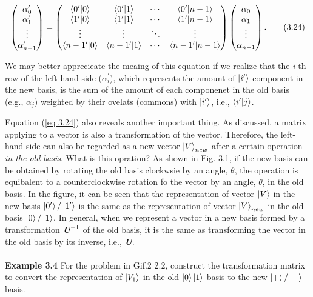 \documentclass{article}
\begin{document}
\begin{equation} \label{eq 3.24}
    \begin{pmatrix}
        \alpha^\prime_0\\
        \alpha^\prime_1\\
        \vdots\\
        \alpha^\prime_{n-1}\\
    \end{pmatrix}=
    \begin{pmatrix}
        \braket{0^\prime|0}&\braket{0^\prime|1}&\cdots&\braket{0^\prime|n-1}\\
        \braket{1^\prime|0}&\braket{1^\prime|1}&\cdots&\braket{1^\prime|n-1}\\
        \vdots&\vdots&\ddots&\vdots\\
        \braket{n-1^\prime|0}&\braket{n-1^\prime|1}&\cdots&\braket{n-1^\prime|n-1}\\        
    \end{pmatrix}
    \begin{pmatrix}
         \alpha_0\\
        \alpha_1\\
        \vdots\\
        \alpha_{n-1}\\
    \end{pmatrix}. \tag{3.24}
\end{equation}

We may better apprecieate the meaing of this equation if we realize that the \textit{i}-th
row of the left-hand side ($\alpha_{i}^\prime$), which represents the amount of $\ket{i^\prime}$
component in the new basis, is the sum of the amount of each componenet
in the old basis (e.g., $\alpha_j$) weighted by their ovelats (commons) with $\ket{i^\prime}$, i.e., $\braket{i^\prime|j}$.

Equation (\ref{eq 3.24}) also reveals another important thing. As discussed,
a matrix applying to a vector is also a transformation of the vector. Therefore, the left-hand
side can also be regarded as a new vector $\ket{V}_{new}$ after a certain operation \textit{in the old basis}.
What is this opration? As shown in Fig. 3.1, if the new basis can be obtained
by rotating the old basis clockwsie by an angle, $\theta$, the operation is equibalent to a
counterclockwise rotation fo the vector by an angle, $\theta$, in the old basis.
In the figure, it can be seen that the representation of vector $\ket{V}$ in the new
basis $\ket{0^\prime}/\ket{1^\prime}$ is the same as the representation of vector
$\ket{V}_{new}$ in the old basis $\ket{0}/\ket{1}$. In general, when we represent a vector in a new basis 
formed by a transformation $\textit{\textbf{U}}^{-1}$ of the old basis, it is the same as 
transforming the vector in the old basis by its inverse, i.e., \textit{\textbf{U}}.
\\\\
\textbf{Example 3.4} For the problem in Gif.2 2.2, construct the transformation matrix to 
convert the representation of $\ket{V_1}$ in the old $\ket{0}\ket{1}$
basis to the new $\ket{+}/\ket{-}$ basis.
\end{document}
